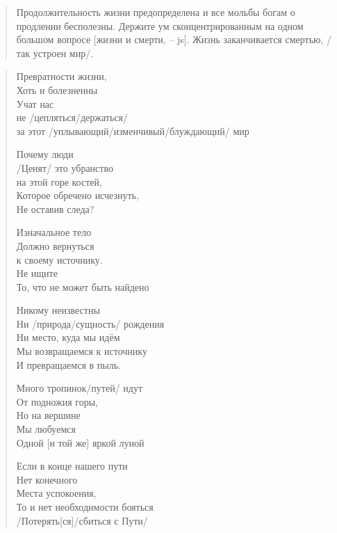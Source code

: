 \begin{ver}
  \begin{quote}
    Продолжительность жизни предопределена и все мольбы богам о
    продлении бесполезны. Держите ум сконцентрированным на одном
    большом вопросе [жизни и смерти, -- js]. Жизнь заканчивается
    смертью, /так устроен мир/. 
  \end{quote}
\end{ver}

\begin{ver}
  \begin{quote}
    \begin{verses}
      Превратности жизни,\\
      Хоть и болезненны\\
      Учат нас\\
      не /цепляться/держаться/\\
      за этот /уплывающий/изменчивый/блуждающий/ мир
      
      Почему люди\\
      /Ценят/ это убранство\\
      на этой горе костей,\\
      Которое обречено исчезнуть,\\
      Не оставив следа?
      
      Изначальное тело\\
      Должно вернуться \\
      к своему источнику.\\
      Не ищите\\
      То, что не может быть найдено
      
      Никому неизвестны\\
      Ни /природа/сущность/ рождения\\
      Ни место, куда мы идём\\
      Мы возвращаемся к источнику\\
      И превращаемся в пыль.
      
      Много тропинок/путей/ идут\\
      От подножия горы,\\
      Но на вершине\\
      Мы любуемся\\
      Одной [и той же] яркой луной
      
      Если в конце нашего пути\\
      Нет конечного\\
      Места успокоения,\\
      То и нет необходимости бояться\\
      /Потерять[ся]/сбиться с Пути/
      

\end{verses}
\end{quote}
\end{ver}
